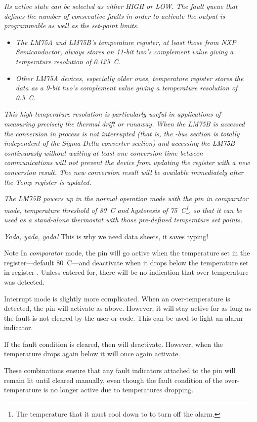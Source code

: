 \emph{Its active state can be selected as either HIGH or LOW. The fault queue that defines the number of consecutive faults in order to activate the  output is programmable as well as the set-point limits.
}
\begin{itemize}
    \item \emph{The LM75A and LM75B's temperature register, at least those from NXP Semiconductor, always stores an 11-bit two’s complement value giving a temperature resolution of 0.125\textdegree{}~C.}
    \item \emph{Other LM75A devices, especially older ones, temperature register stores the data as a 9-bit two’s complement value giving a temperature resolution of 0.5\textdegree{}~C.}
\end{itemize}

\emph{This high temperature resolution is particularly useful in applications of measuring precisely the thermal drift or runaway. When the LM75B is accessed the conversion in process is not interrupted (that is, the \twi-bus section is totally independent of the Sigma-Delta converter section) and accessing the LM75B continuously without waiting at least one conversion time between communications will not prevent the device from updating the  register with a new conversion result. The new conversion result will be available immediately after the Temp register is updated.}

\emph{The LM75B powers up in the normal operation mode with the  pin in comparator mode, temperature threshold of 80\textdegree{}~C and hysteresis of 75\textdegree{}~C\footnote{The temperature that it must cool down to to turn off the alarm.}, so that it can be used as a stand-alone thermostat with those pre-defined temperature set points.}

\emph{Yada, yada, yada!} This is why we need data sheets, it saves typing!

\begin{tips}{Note}
    In \emph{comparator} mode, the  pin will go active when the temperature set in the  register---default 80\textdegree{}~C---and deactivate when it drops below the temperature set in register . Unless catered for, there will be no indication that over-temperature was detected.

    Interrupt mode is slightly more complicated. When an over-temperature is detected, the  pin will activate as above. However, it will stay active for as long as the fault is not cleared by the user or code. This can be used to light an alarm indicator.

    If the fault condition is cleared, then  will deactivate. However, when the temperature drops again below  it will once again activate.

    These combinations ensure that any fault indicators attached to the  pin will remain lit until cleared manually, even though the fault condition of the over-temperature is no longer active due to temperatures dropping.
\end{tips}

